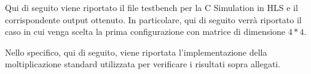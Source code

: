Qui di seguito viene riportato il file testbench per la C Simulation in HLS e il corrispondente output ottenuto. In particolare, qui di seguito verrà riportato il caso in cui venga scelta la prima configurazione con matrice di dimensione $4*4$.




Nello specifico, qui di seguito, viene riportata l'implementazione della moltiplicazione standard utilizzata per verificare i risultati sopra allegati.

